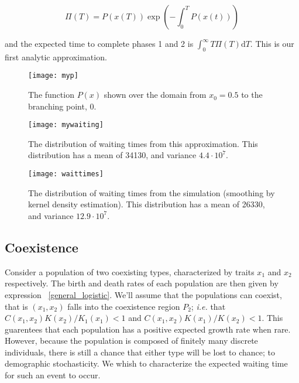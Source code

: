 \documentclass[authoryear,review,11pt]{elsarticle}
\newcommand{\ud}{\mathrm{d}}
\begin{document}
\begin{equation}
\Pi(T) = P(x(T)) \exp\left( -\int_0^T P(x(t)) \right)
\label{pdf}
\end{equation}

and the expected time to complete phases 1 and 2 is $\int_0^{\infty} T \Pi(T) \ud T$. This is our first analytic approximation.  

\begin{figure}
\begin{center}
\texttt{[image: myp]}
\caption{The function $P(x)$ shown over the domain from $x_0 = 0.5 $ to the branching point, 0.}
\end{center}
\end{figure}

\begin{figure}
\begin{center}
\texttt{[image: mywaiting]}
\caption{The distribution of waiting times from this approximation.  This distribution has a mean of 34130, and variance $4.4\cdot 10^7$.}
\end{center}
\end{figure}

\begin{figure}
\begin{center}
\texttt{[image: waittimes]}
\caption{The distribution of waiting times from the simulation (smoothing by kernel density estimation).   This distribution has a mean of 26330, and variance $12.9\cdot 10^7$.}
\end{center}
\end{figure}




\subsection{Coexistence}
Consider a population of two coexisting types, characterized by traits $x_1$ and $x_2$ respectively.  The birth and death rates of each population are then given by expression ~\eqref{general_logistic}.  We'll assume that the populations can coexist, that is $(x_1, x_2)$ falls into the coexistence region $P_2$; \emph{i.e.} that $C(x_1,x_2)K(x_2) /K_1(x_1) < 1 $ and $C(x_1, x_2) K(x_1)/K(x_2) < 1$.  This guarentees that each population has a positive expected growth rate when rare.  However, because the population is composed of finitely many discrete individuals, there is still a chance that either type will be lost to chance; to demographic stochasticity.  We whish to characterize the expected waiting time for such an event to occur. 
\end{document}
